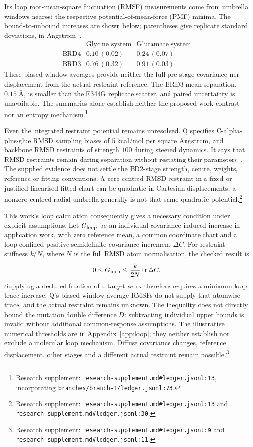 \documentclass{article}
\begin{document}
Its loop root-mean-square fluctuation (RMSF) measurements come from umbrella windows nearest the respective potential-of-mean-force (PMF) minima. The bound-to-unbound increases are shown below; parentheses give replicate standard deviations, in Angstrom~\cite{Q}.
\[
\begin{array}{lcc}
 &\text{Glycine system}&\text{Glutamate system}\\
\text{BRD4}&0.10\ (0.02)&0.24\ (0.07)\\
\text{BRD3}&0.76\ (0.32)&0.91\ (0.03)
\end{array}
\]
These biased-window averages provide neither the full pre-stage covariance nor displacement from the actual restraint reference. The BRD3 mean separation, \(0.15\) \AA{}, is smaller than the E344G replicate scatter, and paired uncertainty is unavailable. The summaries alone establish neither the proposed work contrast nor an entropy mechanism.\footnote{Research supplement: \nolinkurl{research-supplement.md\#ledger.jsonl:13}, incorporating \nolinkurl{branches/branch-1/ledger.jsonl:73}.}

Even the integrated restraint potential remains unresolved. Q specifies C-alpha-plus-glue RMSD sampling biases of \(5\) kcal/mol per square Angstrom, and backbone RMSD restraints of strength \(100\) during steered dynamics. It says that RMSD restraints remain during separation without restating their parameters~\cite{Q}. The supplied evidence does not settle the BD2-stage strength, centre, weights, reference or fitting conventions. A zero-centred RMSD restraint in a fixed or justified linearised fitted chart can be quadratic in Cartesian displacements; a nonzero-centred radial umbrella generally is not that same quadratic potential.\footnote{Research supplement: \nolinkurl{research-supplement.md\#ledger.jsonl:13} and \nolinkurl{research-supplement.md\#ledger.jsonl:30}.}

This work's loop calculation consequently gives a necessary condition under explicit assumptions. Let \(G_{\rm loop}\) be an individual covariance-induced increase in application work, with zero reference mean, a common coordinate chart and a loop-confined positive-semidefinite covariance increment \(\Delta C\). For restraint stiffness \(k/N\), where \(N\) is the full RMSD atom normalisation, the checked result is
\[
 0\leq G_{\rm loop}\leq\frac{k}{2N}\operatorname{tr}\Delta C.
\]
Supplying a declared fraction of a target work therefore requires a minimum loop trace increase. Q's biased-window average RMSFs do not supply that atomwise trace, and the actual restraint remains unknown. The inequality does not directly bound the mutation double difference \(D\): subtracting individual upper bounds is invalid without additional common-response assumptions. The illustrative numerical thresholds are in Appendix~\ref{app:loop}; they neither establish nor exclude a molecular loop mechanism. Diffuse covariance changes, reference displacement, other stages and a different actual restraint remain possible.\footnote{Research supplement: \nolinkurl{research-supplement.md\#ledger.jsonl:9} and \nolinkurl{research-supplement.md\#ledger.jsonl:11}.}
\end{document}

